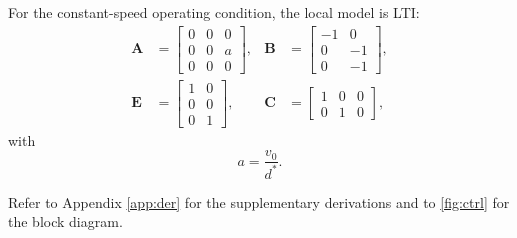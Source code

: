 \documentclass[journal,a4paper]{IEEEtran}
\begin{document}
For the constant-speed operating condition, the local model is LTI:
\begin{equation}
\begin{aligned}
\mathbf{A}
&=
\begin{bmatrix}
0&0&0\\
0&0&a\\
0&0&0
\end{bmatrix},
&
\mathbf{B}
&=
\begin{bmatrix}
-1&0\\
0&-1\\
0&-1
\end{bmatrix},\\[6pt]
\mathbf{E}
&=
\begin{bmatrix}
1&0\\
0&0\\
0&1
\end{bmatrix},
&
\mathbf{C}
&=
\begin{bmatrix}
1&0&0\\
0&1&0
\end{bmatrix},
\end{aligned}
\label{eq:mats}
\end{equation}
with
\[
a=\frac{v_0}{d^\ast}.
\]


Refer to Appendix \ref{app:der} for the supplementary derivations and to \autoref{fig:ctrl} for the block diagram. 
\end{document}
